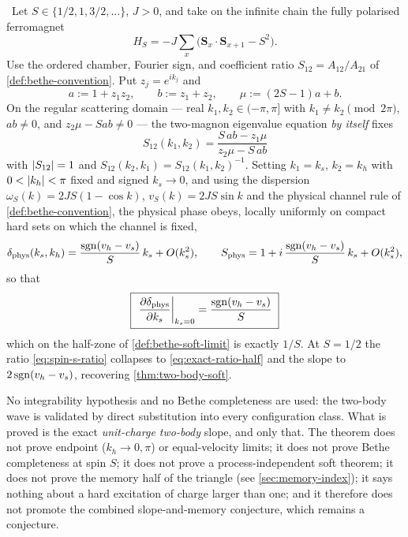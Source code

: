 \begin{theorem}
\label{thm:spin-s-slope}
\statusProved\ Let $S\in\{1/2,1,3/2,\dots\}$, $J>0$, and take on the infinite
chain the fully polarised ferromagnet
\begin{equation}
  H_S=-J\sum_x\bigl(\bm{S}_x\cdot\bm{S}_{x+1}-S^2\bigr).
\end{equation}
Use the ordered chamber, Fourier sign, and coefficient ratio
$S_{12}=A_{12}/A_{21}$ of \cref{def:bethe-convention}. Put $z_j=e^{ik_j}$ and
\begin{equation}
  a:=1+z_1z_2,\qquad b:=z_1+z_2,\qquad \mu:=(2S-1)a+b .
\end{equation}
On the regular scattering domain --- real $k_1,k_2\in(-\pi,\pi]$ with
$k_1\ne k_2 \pmod{2\pi}$, $ab\ne0$, and $z_2\mu-Sab\ne0$ --- the two-magnon
eigenvalue equation \emph{by itself} fixes
\begin{equation}
  \boxed{\;S_{12}(k_1,k_2)=\frac{S\,ab-z_1\mu}{z_2\mu-S\,ab}\;}
  \label{eq:spin-s-ratio}
\end{equation}
with $\lvert S_{12}\rvert=1$ and $S_{12}(k_2,k_1)=S_{12}(k_1,k_2)^{-1}$. Setting
$k_1=k_s$, $k_2=k_h$ with $0<\lvert k_h\rvert<\pi$ fixed and signed $k_s\to0$, and
using the dispersion $\omega_S(k)=2JS(1-\cos k)$, $v_S(k)=2JS\sin k$ and the
physical channel rule of \cref{def:bethe-convention}, the physical phase
obeys, locally uniformly on compact hard sets on which the channel is fixed,
\begin{equation}
  \delta_{\mathrm{phys}}(k_s,k_h)=\frac{\operatorname{sgn}(v_h-v_s)}{S}\,k_s+O(k_s^2),
  \qquad
  S_{\mathrm{phys}}=1+i\,\frac{\operatorname{sgn}(v_h-v_s)}{S}\,k_s+O(k_s^2),
\end{equation}
so that
\begin{equation}
  \boxed{\;
   \left.\frac{\partial\delta_{\mathrm{phys}}}{\partial k_s}\right|_{k_s=0}
   =\frac{\operatorname{sgn}(v_h-v_s)}{S}\;}
  \label{eq:soft-slope-law}
\end{equation}
which on the half-zone of \cref{def:bethe-soft-limit} is exactly $1/S$. At
$S=1/2$ the ratio \cref{eq:spin-s-ratio} collapses to
\cref{eq:exact-ratio-half} and the slope to $2\operatorname{sgn}(v_h-v_s)$, recovering
\cref{thm:two-body-soft}.
\end{theorem}
\begin{scope}
No integrability hypothesis and no Bethe completeness are used: the two-body
wave is validated by direct substitution into every configuration class. What
is proved is the exact \emph{unit-charge two-body} slope, and only that. The
theorem does not prove endpoint ($k_h\to0,\pi$) or equal-velocity limits; it
does not prove Bethe completeness at spin $S$; it does not prove a
process-independent soft theorem; it does not prove the memory half of the
triangle (see \cref{sec:memory-index}); it says nothing about a hard
excitation of charge larger than one; and it therefore does not promote the
combined slope-and-memory conjecture, which remains a conjecture.
\end{scope}
